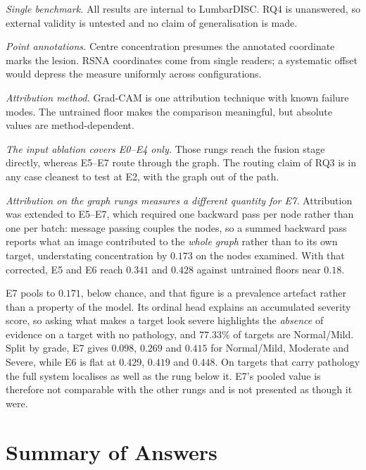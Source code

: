 \documentclass[12pt,a4paper]{report}
\begin{document}
\emph{Single benchmark.} All results are internal to LumbarDISC. RQ4 is
unanswered, so external validity is untested and no claim of generalisation is
made.

\emph{Point annotations.} Centre concentration presumes the annotated coordinate
marks the lesion. RSNA coordinates come from single readers; a systematic offset
would depress the measure uniformly across configurations.

\emph{Attribution method.} Grad-CAM is one attribution technique with known
failure modes. The untrained floor makes the comparison meaningful, but absolute
values are method-dependent.

\emph{The input ablation covers E0--E4 only.} Those rungs reach the fusion stage
directly, whereas E5--E7 route through the graph. The routing claim of RQ3 is in
any case cleanest to test at E2, with the graph out of the path.

\emph{Attribution on the graph rungs measures a different quantity for E7.}
Attribution was extended to E5--E7, which required one backward pass per node
rather than one per batch: message passing couples the nodes, so a summed
backward pass reports what an image contributed to the \emph{whole graph} rather
than to its own target, understating concentration by $0.173$ on the nodes
examined. With that corrected, E5 and E6 reach $0.341$ and $0.428$ against
untrained floors near $0.18$.

E7 pools to $0.171$, below chance, and that figure is a prevalence artefact
rather than a property of the model. Its ordinal head explains an accumulated
severity score, so asking what makes a target look severe highlights the
\emph{absence} of evidence on a target with no pathology, and $77.33\%$ of
targets are Normal/Mild. Split by grade, E7 gives $0.098$, $0.269$ and $0.415$
for Normal/Mild, Moderate and Severe, while E6 is flat at $0.429$, $0.419$ and
$0.448$. On targets that carry pathology the full system localises as well as
the rung below it. E7's pooled value is therefore not comparable with the other
rungs and is not presented as though it were.

\section{Summary of Answers}
\label{sec:results-summary}
\end{document}
